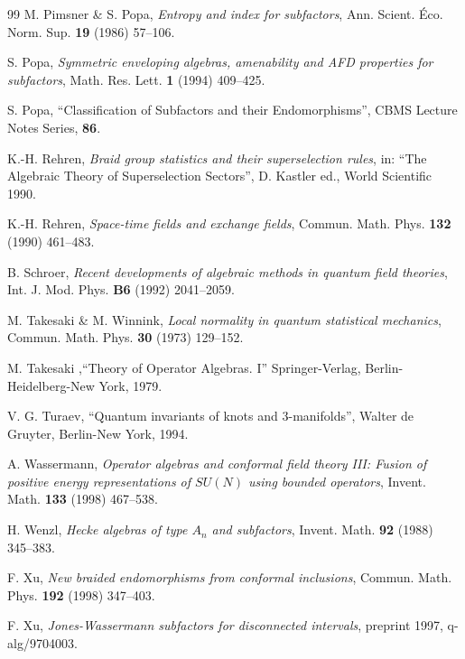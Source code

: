 \documentclass[12pt]{article}
\begin{document}
{\begin{thebibliography}{99}
M. Pimsner \& S. Popa, {\it Entropy and index for subfactors}, Ann.  
Scient.  \'{E}co.  Norm.  Sup.  {\bf 19} (1986) 57--106.

S. Popa, {\it Symmetric enveloping algebras, amenability and AFD 
properties for subfactors}, Math.  Res.  Lett.  {\bf 1} (1994) 
409--425.

S. Popa, ``Classification of Subfactors and their Endomorphisms'', CBMS
Lecture Notes Series, {\bf 86}.

K.-H.  Rehren,  {\it Braid group statistics and their superselection
rules}, in: ``The Algebraic Theory of Superselection Sectors'', D.
Kastler ed., World Scientific 1990.

K.-H. Rehren,
{\it Space-time fields and exchange fields},
Commun. Math. Phys. {\bf 132} (1990) 461--483.

B. Schroer,
{\it Recent developments of algebraic methods in quantum field
theories}, Int. J. Mod. Phys. {\bf B6} (1992) 2041--2059.

M. Takesaki \& M. Winnink,
{\it Local normality in quantum statistical mechanics},
Commun. Math. Phys. {\bf 30} (1973) 129--152.

M. Takesaki ,``Theory of Operator Algebras. I'' Springer-Verlag,
Berlin-Heidelberg-New York, 1979.

  V. G. Turaev, ``Quantum invariants of
knots and 3-manifolds'', Walter  de Gruyter, Berlin-New York, 1994.

 A. Wassermann,
{\it Operator algebras and conformal field theory III: Fusion
of positive energy representations of $SU(N)$ using bounded
operators}, Invent. Math. {\bf 133} (1998) 467--538.

H. Wenzl,
{\it Hecke algebras of type $A_n$ and subfactors},
Invent. Math. {\bf 92} (1988) 345--383.

F. Xu,
{\it New braided endomorphisms from conformal inclusions},
Commun. Math. Phys. {\bf 192} (1998) 347--403.

F. Xu,
{\it Jones-Wassermann subfactors for disconnected intervals},
preprint 1997, q-alg/9704003.

\end{thebibliography}}
\end{document}
